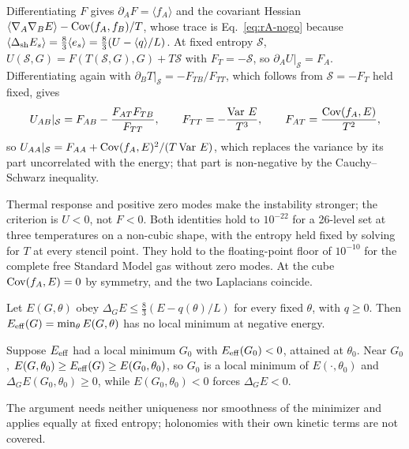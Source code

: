 \begin{rAproof}
Differentiating $F$ gives $\partial_AF=\langle f_A\rangle$ and the covariant Hessian $\langle\nabla_A\nabla_BE\rangle-\operatorname{Cov}(f_A,f_B)/T$, whose trace is Eq.~\eqref{eq:rA-nogo} because $\langle\Delta_{\mathrm{sh}}E_s\rangle=\tfrac83\langle e_s\rangle=\tfrac83(U-\langle q\rangle/L)$.
At fixed entropy $\mathcal S$, $U(\mathcal S,G)=F(T(\mathcal S,G),G)+T\mathcal S$ with $F_T=-\mathcal S$, so $\partial_AU|_{\mathcal S}=F_A$.
Differentiating again with $\partial_BT|_{\mathcal S}=-F_{TB}/F_{TT}$, which follows from $\mathcal S=-F_T$ held fixed, gives
\begin{equation}
U_{AB}|_{\mathcal S}=F_{AB}-\frac{F_{AT}F_{TB}}{F_{TT}},\qquad F_{TT}=-\frac{\operatorname{Var}\,E}{T^3},\qquad F_{AT}=\frac{\operatorname{Cov}(f_A,E)}{T^2},
\end{equation}
so $U_{AA}|_{\mathcal S}=F_{AA}+\operatorname{Cov}(f_A,E)^2/(T\operatorname{Var}\,E)$, which replaces the variance by its part uncorrelated with the energy; that part is non-negative by the Cauchy--Schwarz inequality.
\end{rAproof}

Thermal response and positive zero modes make the instability stronger; the criterion is $U<0$, not $F<0$.
Both identities hold to $10^{-22}$ for a 26-level set at three temperatures on a non-cubic shape, with the entropy held fixed by solving for $T$ at every stencil point. %
They hold to the floating-point floor of $10^{-10}$ for the complete free Standard Model gas without zero modes. %
At the cube $\operatorname{Cov}(f_A,E)=0$ by symmetry, and the two Laplacians coincide.

\begin{rAprop}\label{prop:rA-holonomy}
Let $E(G,\theta)$ obey $\Delta_GE\leq\tfrac83(E-q(\theta)/L)$ for every fixed $\theta$, with $q\geq0$.
Then $E_{\rm eff}(G)=\min_\theta E(G,\theta)$ has no local minimum at negative energy.
\end{rAprop}

\begin{rAproof}
Suppose $E_{\rm eff}$ had a local minimum $G_0$ with $E_{\rm eff}(G_0)<0$, attained at $\theta_0$.
Near $G_0$, $E(G,\theta_0)\geq E_{\rm eff}(G)\geq E(G_0,\theta_0)$, so $G_0$ is a local minimum of $E(\cdot,\theta_0)$ and $\Delta_GE(G_0,\theta_0)\geq0$, while $E(G_0,\theta_0)<0$ forces $\Delta_GE<0$.
\end{rAproof}

The argument needs neither uniqueness nor smoothness of the minimizer and applies equally at fixed entropy; holonomies with their own kinetic terms are not covered.

